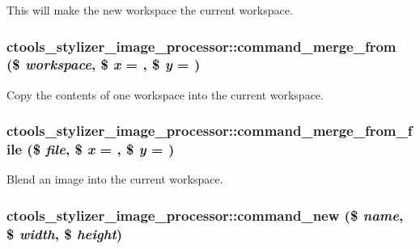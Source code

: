 This will make the new workspace the current workspace. \hypertarget{classctools__stylizer__image__processor_a44a3092fdcc8287bf0cf730fa81e8a95}{
\subsubsection[{command\_\-merge\_\-from}]{\setlength{\rightskip}{0pt plus 5cm}ctools\_\-stylizer\_\-image\_\-processor::command\_\-merge\_\-from (\$ {\em workspace}, \/  \$ {\em x} = {}, \/  \$ {\em y} = {})}}
\label{classctools__stylizer__image__processor_a44a3092fdcc8287bf0cf730fa81e8a95}
Copy the contents of one workspace into the current workspace. \hypertarget{classctools__stylizer__image__processor_ab20bbac2bcb27f38f8a20334df367814}{
\subsubsection[{command\_\-merge\_\-from\_\-file}]{\setlength{\rightskip}{0pt plus 5cm}ctools\_\-stylizer\_\-image\_\-processor::command\_\-merge\_\-from\_\-file (\$ {\em file}, \/  \$ {\em x} = {}, \/  \$ {\em y} = {})}}
\label{classctools__stylizer__image__processor_ab20bbac2bcb27f38f8a20334df367814}
Blend an image into the current workspace. \hypertarget{classctools__stylizer__image__processor_a8d40f8e9f29eef9d25907a05dd9874d7}{
\subsubsection[{command\_\-new}]{\setlength{\rightskip}{0pt plus 5cm}ctools\_\-stylizer\_\-image\_\-processor::command\_\-new (\$ {\em name}, \/  \$ {\em width}, \/  \$ {\em height})}}
\label{classctools__stylizer__image__processor_a8d40f8e9f29eef9d25907a05dd9874d7}

